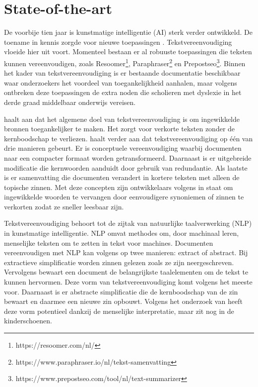 
\section{State-of-the-art}%
\label{sec:state-of-the-art}

De voorbije tien jaar is kunstmatige intelligentie (AI) sterk verder ontwikkeld. De toename in kennis zorgde voor nieuwe toepassingen \autocite{Vasista2022}. Tekstvereenvoudiging vloeide hier uit voort. Momenteel bestaan er al robuuste toepassingen die teksten kunnen vereenvoudigen, zoals Resoomer\footnote{https://resoomer.com/nl/}, Paraphraser\footnote{https://www.paraphraser.io/nl/tekst-samenvatting} en Prepostseo\footnote{https://www.prepostseo.com/tool/nl/text-summarizer}. Binnen het kader van tekstvereenvoudiging is er bestaande documentatie beschikbaar waar onderzoekers het voordeel van toegankelijkheid aanhalen, maar volgens \textcite{Gooding2022} ontbreken deze toepassingen de extra noden die scholieren met dyslexie in het derde graad middelbaar onderwijs vereisen.

\textcite{Shardlow2014} haalt aan dat het algemene doel van tekstvereenvoudiging is om ingewikkelde bronnen toegankelijker te maken. Het zorgt voor verkorte teksten zonder de kernboodschap te verliezen. \textcite{Siddharthan2014} haalt verder aan dat tekstvereenvoudiging op één van drie manieren gebeurt. Er is conceptuele vereenvoudiging waarbij documenten naar een compacter formaat worden getransformeerd. Daarnaast is er uitgebreide modificatie die kernwoorden aanduidt door gebruik van redundantie. Als laatste is er samenvatting die documenten verandert in kortere teksten met alleen de topische zinnen. Met deze concepten zijn ontwikkelaars volgens \textcite{Siddharthan2014} in staat om ingewikkelde woorden te vervangen door eenvoudigere synoniemen of zinnen te verkorten zodat ze sneller leesbaar zijn.

Tekstvereenvoudiging behoort tot de zijtak van natuurlijke taalverwerking (NLP) in kunstmatige intelligentie. NLP omvat methodes om, door machinaal leren, menselijke teksten om te zetten in tekst voor machines. Documenten vereenvoudigen met NLP kan volgens \textcite{Chowdhary2020} op twee manieren: extract of abstract. Bij extractieve simplificatie worden zinnen gelezen zoals ze zijn neergeschreven. Vervolgens bewaart een document de belangrijkste taalelementen om de tekst te kunnen hervormen. Deze vorm van tekstvereenvoudiging komt volgens \autocite{Sciforce2020} het meeste voor. Daarnaast is er abstracte simplificatie die de kernboodschap van de zin bewaart en daarmee een nieuwe zin opbouwt. Volgens het onderzoek van \textcite{Chowdhary2020} heeft deze vorm potentieel dankzij de menselijke interpretatie, maar zit nog in de kinderschoenen.

